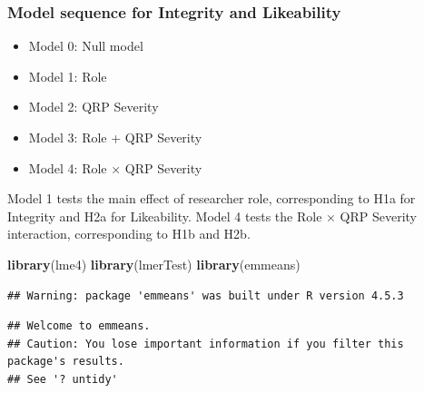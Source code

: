 \documentclass[
]{article}
\newenvironment{Shaded}{\begin{snugshade}}{\end{snugshade}}
\newcommand{\FunctionTok}[1]{\textcolor[rgb]{0.13,0.29,0.53}{\textbf{#1}}}
\newcommand{\NormalTok}[1]{#1}
\providecommand{\tightlist}{%
  \setlength{\itemsep}{0pt}\setlength{\parskip}{0pt}}
\begin{document}
\subsubsection{Model sequence for Integrity and
Likeability}\label{model-sequence-for-integrity-and-likeability}

\begin{itemize}
\tightlist
\item
  Model 0: Null model
\item
  Model 1: Role
\item
  Model 2: QRP Severity
\item
  Model 3: Role + QRP Severity
\item
  Model 4: Role × QRP Severity
\end{itemize}

Model 1 tests the main effect of researcher role, corresponding to H1a
for Integrity and H2a for Likeability. Model 4 tests the Role × QRP
Severity interaction, corresponding to H1b and H2b.

\begin{Shaded}
\begin{Highlighting}[]
\FunctionTok{library}\NormalTok{(lme4)}
\FunctionTok{library}\NormalTok{(lmerTest)}
\FunctionTok{library}\NormalTok{(emmeans)}
\end{Highlighting}
\end{Shaded}

\begin{verbatim}
## Warning: package 'emmeans' was built under R version 4.5.3
\end{verbatim}

\begin{verbatim}
## Welcome to emmeans.
## Caution: You lose important information if you filter this package's results.
## See '? untidy'
\end{verbatim}
\end{document}
